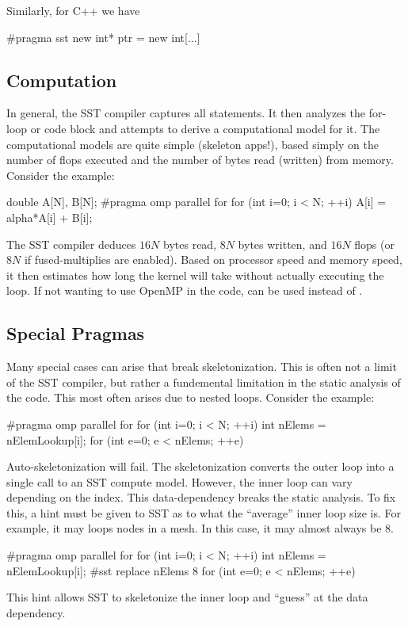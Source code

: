 Similarly, for C++ we have
\begin{CppCode}
#pragma sst new
  int* ptr = new int[...]
\end{CppCode}

\subsection{Computation}
In general, the SST compiler captures all  statements.
It then analyzes the for-loop or code block and attempts to derive a computational model for it.
The computational models are quite simple (skeleton apps!), 
based simply on the number of flops executed and the number of bytes read (written) from memory.
Consider the example:

\begin{CppCode}
double A[N], B[N];
#pragma omp parallel for
for (int i=0; i < N; ++i){
  A[i] = alpha*A[i] + B[i];
}
\end{CppCode}
The SST compiler deduces $16N$ bytes read, $8N$ bytes written, and $16N$ flops (or $8N$ if fused-multiplies are enabled).
Based on processor speed and memory speed, it then estimates how long the kernel will take without actually executing the loop.
If not wanting to use OpenMP in the code,  can be used instead of .

\subsection{Special Pragmas}
Many special cases can arise that break skeletonization.
This is often not a limit of the SST compiler, but rather a fundemental limitation in the static analysis of the code.
This most often arises due to nested loops. Consider the example:

\begin{CppCode}
#pragma omp parallel for
for (int i=0; i < N; ++i){
  int nElems = nElemLookup[i];
  for (int e=0; e < nElems; ++e){
  }
}
\end{CppCode}
Auto-skeletonization will fail. The skeletonization converts the outer loop into a single call to an SST compute model.
However, the inner loop can vary depending on the index.
This data-dependency breaks the static analysis.
To fix this, a hint must be given to SST as to what the ``average'' inner loop size is.
For example, it may loops nodes in a mesh. In this case, it may almost always be 8.

\begin{CppCode}
#pragma omp parallel for
for (int i=0; i < N; ++i){
  int nElems = nElemLookup[i];
  #sst replace nElems 8
  for (int e=0; e < nElems; ++e){
  }
}
\end{CppCode}
This hint allows SST to skeletonize the inner loop and ``guess'' at the data dependency.



